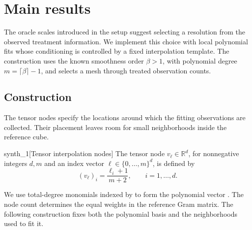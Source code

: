 \section{Main results}

The oracle scales introduced in the setup suggest selecting a resolution from the observed treatment information. We implement this choice with local polynomial fits whose conditioning is controlled by a fixed interpolation template. The construction uses the known smoothness order \(\beta>1\), with polynomial degree \(m=\lceil\beta\rceil-1\), and selects a mesh through treated observation counts.

\subsection{Construction}

The tensor nodes  specify the locations around which the fitting observations are collected. Their placement leaves room for small neighborhoods inside the reference cube.

\begin{definitionv}{synth_1}[Tensor interpolation nodes]
The tensor node \(v_\ell\in\mathbb R^d\), for nonnegative integers \(d,m\) and an index vector \(\ell\in\{0,\ldots,m\}^d\), is defined by
\[
(v_\ell)_i=\frac{\ell_i+1}{m+2},
\qquad i=1,\ldots,d.
\]
\end{definitionv}

We use total-degree monomials indexed by  to form the polynomial vector . The node count  determines the equal weights in the reference Gram matrix. The following construction fixes both the polynomial basis and the neighborhoods used to fit it.


